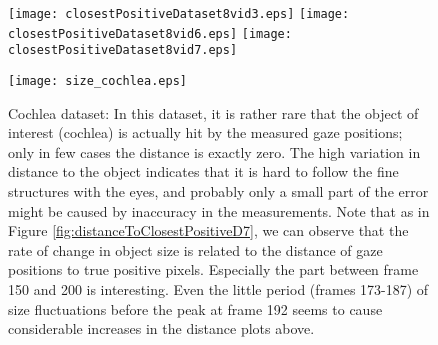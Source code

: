 \begin{figure}[ht]
	  \texttt{[image: closestPositiveDataset8vid3.eps]}
	  \texttt{[image: closestPositiveDataset8vid6.eps]}
	  \texttt{[image: closestPositiveDataset8vid7.eps]}
	  
	  \vspace{3mm}
	  \texttt{[image: size\_cochlea.eps]}	  
	  \caption{Cochlea dataset: In this dataset, it is rather rare that the object of interest (cochlea) is actually hit by the measured gaze positions; only in few cases the distance is exactly zero. The high variation in distance to the object indicates that it is hard to follow the fine structures with the eyes, and probably only a small part of the error might be caused by inaccuracy in the measurements. Note that as in Figure \ref{fig:distanceToClosestPositiveD7}, we can observe that the rate of change in object size is related to the distance of gaze positions to true positive pixels. Especially the part between frame 150 and 200 is interesting. Even the little period (frames 173-187) of size fluctuations before the peak at frame 192 seems to cause considerable increases in the distance plots above.}
	\label{fig:distanceToClosestPositiveD8}
\end{figure}

